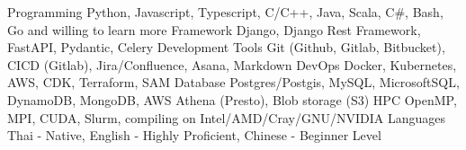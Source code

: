 

\begin{cvskills}

  \cvskill
    {Programming} %
    {Python, Javascript, Typescript, C/C++, Java, Scala, C\#, Bash, Go and willing to learn more} %
  \cvskill
    {Framework}
    {Django, Django Rest Framework, FastAPI, Pydantic, Celery}
  \cvskill
    {Development Tools} %
    {Git (Github, Gitlab, Bitbucket), CICD (Gitlab), Jira/Confluence, Asana, Markdown} %
  \cvskill
    {DevOps} %
    {Docker, Kubernetes, AWS, CDK, Terraform, SAM} %
  \cvskill
    {Database}
    {Postgres/Postgis, MySQL, MicrosoftSQL, DynamoDB, MongoDB, AWS Athena (Presto), Blob storage (S3)}
  \cvskill
    {HPC} %
    {OpenMP, MPI, CUDA, Slurm, compiling on Intel/AMD/Cray/GNU/NVIDIA } %
  \cvskill
    {Languages} %
    {Thai - Native, English - Highly Proficient, Chinese - Beginner Level} %
\end{cvskills}

